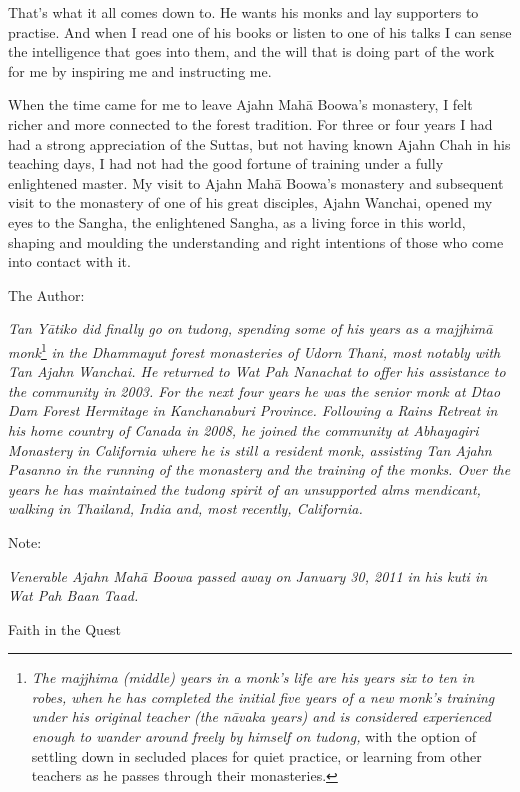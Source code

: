That's what it all comes down to. He wants his monks and lay supporters
to practise. And when I read one of his books or listen to one of his
talks I can sense the intelligence that goes into them, and the will
that is doing part of the work for me by inspiring me and instructing
me.

When the time came for me to leave Ajahn Mahā Boowa's monastery, I felt
richer and more connected to the forest tradition. For three or four
years I had had a strong appreciation of the Suttas, but not having
known Ajahn Chah in his teaching days, I had not had the good fortune of
training under a fully enlightened master. My visit to Ajahn Mahā
Boowa's monastery and subsequent visit to the monastery of one of his
great disciples, Ajahn Wanchai, opened my eyes to the Sangha, the
enlightened Sangha, as a living force in this world, shaping and
moulding the understanding and right intentions of those who come into
contact with it.



The Author:

\emph{Tan Yātiko did finally go on tudong, spending some of his years as
a majjhimā monk}\footnote{\emph{The majjhima (middle) years in a monk's
  life are his years six to ten in robes, when he has completed the
  initial five years of a new monk's training under his original teacher
  (the nāvaka years) and is considered experienced enough to wander
  around freely by himself on tudong,} with the option of settling down
  in secluded places for quiet practice, or learning from other teachers
  as he passes through their monasteries.} \emph{in the Dhammayut forest
monasteries of Udorn Thani, most notably with Tan Ajahn Wanchai. He
returned to Wat Pah Nanachat to offer his assistance to the community in
2003. For the next four years he was the senior monk at Dtao Dam Forest
Hermitage in Kanchanaburi Province. Following a Rains Retreat in his
home country of Canada in 2008, he joined the community at Abhayagiri
Monastery in California where he is still a resident monk, assisting Tan
Ajahn Pasanno in the running of the monastery and the training of the
monks. Over the years he has maintained the tudong spirit of an
unsupported alms mendicant, walking in Thailand, India and, most
recently, California.}

Note:

\emph{Venerable Ajahn Mahā Boowa passed away on January 30, 2011 in his
kuti in Wat Pah Baan Taad.}

Faith in the Quest

